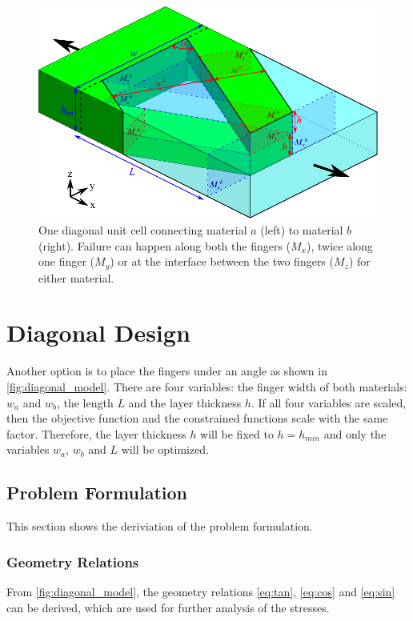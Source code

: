 
\begin{figure}[H]
	\centering
	\includegraphics[width=\columnwidth]{sources/method/diagonal_model_v3.pdf}
	\caption{
		One diagonal unit cell connecting material $a$ (left) to material $b$ (right).
		Failure can happen along both the fingers ($M_x$), twice along one finger ($M_y$) or at the interface between the two fingers ($M_z$) for either material.}
	\label{fig:diagonal_model}
\end{figure}


\section{Diagonal Design}

Another option is to place the fingers under an angle as shown in \autoref{fig:diagonal_model}.
There are four variables: the finger width of both materials: $w_a$ and $w_b$, the length $L$ and the layer thickness $h$. If all four variables are scaled, then the objective function and the constrained functions scale with the same factor. Therefore, the layer thickness $h$ will be fixed to $h = h_{min}$ and only the variables $w_a$, $w_b$ and $L$ will be optimized.

\subsection{Problem Formulation}
This section shows the deriviation of the problem formulation.

\subsubsection{Geometry Relations}
From \autoref{fig:diagonal_model}, the geometry relations \ref{eq:tan}, \ref{eq:cos} and \ref{eq:sin} can be derived, which are used for further analysis of the stresses.

